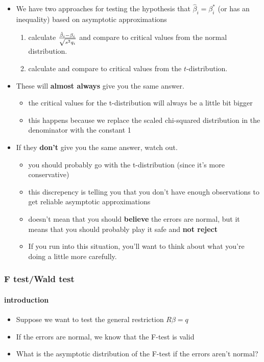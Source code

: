 \documentclass[11pt]{article}
\begin{document}
\begin{itemize}
\item We have two approaches for testing the hypothesis that
         $\hat\beta_i = \beta_i^*$ (or has an inequality) based on
         asymptotic approximations
\begin{enumerate}
\item calculate ${\hat\beta_i - \beta_i \over \sqrt{s^2 q_i}}$
            and compare to critical values from the normal distribution.
\item calculate and compare to critical values from the
            $t$-distribution.
\end{enumerate}
\item These will \textbf{almost always} give you the same answer.
\begin{itemize}
\item the critical values for the t-distribution will always be a
           little bit bigger
\item this happens because we replace the scaled chi-squared
           distribution in the denominator with the constant 1
\end{itemize}
\item If they \textbf{don't} give you the same answer, watch out.
\begin{itemize}
\item you should probably go with the t-distribution (since it's
           more conservative)
\item this discrepency is telling you that you don't have enough
           observations to get reliable asymptotic approximations
\item doesn't mean that you should \textbf{believe} the errors are
           normal, but it means that you should probably play it safe
           and \textbf{not reject}
\item If you run into this situation, you'll want to think about
           what you're doing a little more carefully.
\end{itemize}
\end{itemize}
\subsubsection{F test/Wald test}
\label{sec-3-1-2}
\paragraph{introduction}
\label{sec-3-1-2-1}

\begin{itemize}
\item Suppose we want to test the general restriction $R\beta = q$
\item If the errors are normal, we know that the F-test is valid
\item What is the asymptotic distribution of the F-test if the
         errors aren't normal?
\end{itemize}
\end{document}
